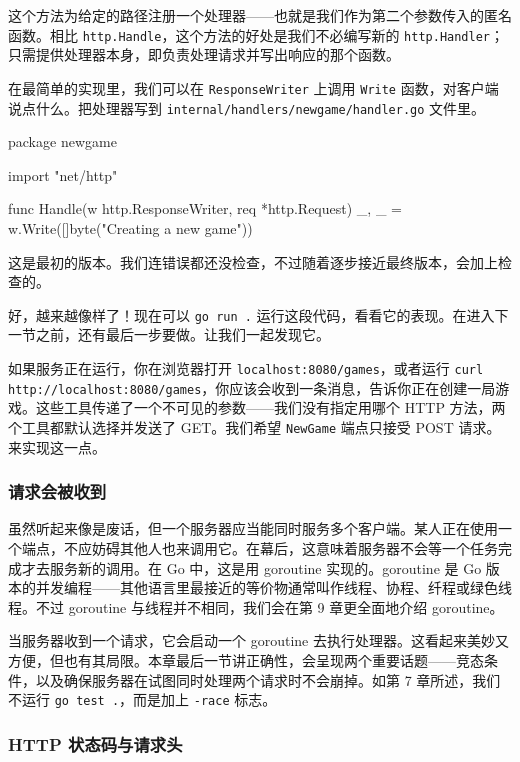 这个方法为给定的路径注册一个处理器——也就是我们作为第二个参数传入的匿名函数。相比 \texttt{http.Handle}，这个方法的好处是我们不必编写新的 \texttt{http.Handler}；只需提供处理器本身，即负责处理请求并写出响应的那个函数。

在最简单的实现里，我们可以在 \texttt{ResponseWriter} 上调用 \texttt{Write} 函数，对客户端说点什么。把处理器写到 \texttt{internal/handlers/newgame/handler.go} 文件里。

\begin{gocode}[title={代码清单 8.6 \texttt{handler.go}：空的 newgame 处理器}]
package newgame

import "net/http"

func Handle(w http.ResponseWriter, req *http.Request) {
    _, _ = w.Write([]byte("Creating a new game"))
}
\end{gocode}

这是最初的版本。我们连错误都还没检查，不过随着逐步接近最终版本，会加上检查的。

好，越来越像样了！现在可以 \texttt{go run .} 运行这段代码，看看它的表现。在进入下一节之前，还有最后一步要做。让我们一起发现它。

如果服务正在运行，你在浏览器打开 \texttt{localhost:8080/games}，或者运行 \texttt{curl http://localhost:8080/games}，你应该会收到一条消息，告诉你正在创建一局游戏。这些工具传递了一个不可见的参数——我们没有指定用哪个 HTTP 方法，两个工具都默认选择并发送了 GET。我们希望 \texttt{NewGame} 端点只接受 POST 请求。来实现这一点。

\subsubsection*{请求会被收到}

虽然听起来像是废话，但一个服务器应当能同时服务多个客户端。某人正在使用一个端点，不应妨碍其他人也来调用它。在幕后，这意味着服务器不会等一个任务完成才去服务新的调用。在 Go 中，这是用 goroutine 实现的。goroutine 是 Go 版本的并发编程——其他语言里最接近的等价物通常叫作线程、协程、纤程或绿色线程。不过 goroutine 与线程并不相同，我们会在第 9 章更全面地介绍 goroutine。

当服务器收到一个请求，它会启动一个 goroutine 去执行处理器。这看起来美妙又方便，但也有其局限。本章最后一节讲正确性，会呈现两个重要话题——竞态条件，以及确保服务器在试图同时处理两个请求时不会崩掉。如第 7 章所述，我们不运行 \texttt{go test .}，而是加上 \texttt{-race} 标志。

\subsubsection*{HTTP 状态码与请求头}

